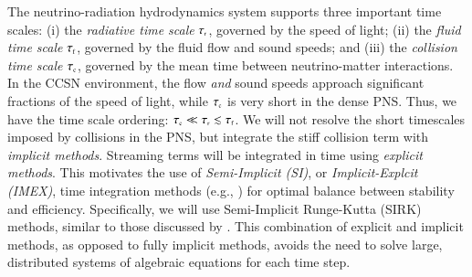 \documentclass[11pt,letterpaper,twoside,english,final]{article}
\begin{document}
The neutrino-radiation hydrodynamics system supports three important time scales: (i) the \emph{radiative time scale} $\tau_{\mbox{\tiny r}}$, governed by the speed of light; (ii) the \emph{fluid time scale} $\tau_{\mbox{\tiny f}}$, governed by the fluid flow and sound speeds; and (iii) the \emph{collision time scale} $\tau_{\mbox{\tiny c}}$, governed by the mean time between neutrino-matter interactions.  
In the CCSN environment, the flow \emph{and} sound speeds approach significant fractions of the speed of light, while $\tau_{\mbox{\tiny c}}$ is very short in the dense PNS.  
Thus, we have the time scale ordering: $\tau_{\mbox{\tiny c}}\ll\tau_{\mbox{\tiny r}}\lesssim\tau_{\mbox{\tiny f}}$.  
We will not resolve the short timescales imposed by collisions in the PNS, but integrate the stiff collision term with \emph{implicit methods}.  
Streaming terms will be integrated in time using \emph{explicit methods}.  
This motivates the use of \emph{Semi-Implicit (SI)}, or \emph{Implicit-Explcit (IMEX)}, time integration methods (e.g., \cite{minion_2003,pareschiRusso_2005,chertock_etal_2015}) for optimal balance between stability and efficiency.  
Specifically, we will use Semi-Implicit Runge-Kutta (SIRK) methods, similar to those discussed by \citet{chertock_etal_2015}.  
This combination of explicit and implicit methods, as opposed to fully implicit methods, avoids  the need to solve large, distributed systems of algebraic equations for each time step.  
\end{document}
